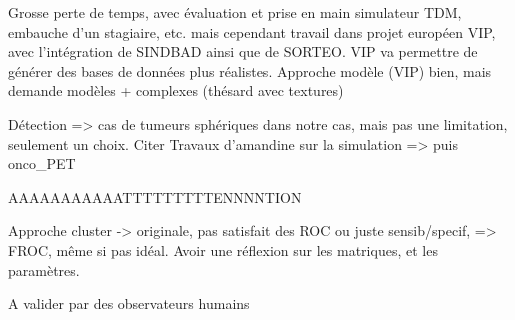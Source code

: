 Grosse perte de temps, avec évaluation et prise en main simulateur TDM, embauche d'un stagiaire, etc.
mais cependant travail dans projet européen VIP, avec l'intégration de SINDBAD ainsi que de SORTEO. VIP va permettre de générer des bases de données plus réalistes.
Approche modèle (VIP) bien, mais demande modèles + complexes (thésard avec textures)

Détection => cas de tumeurs sphériques dans notre cas, mais pas une limitation, seulement un choix. Citer Travaux d'amandine sur la simulation => puis onco\_PET



AAAAAAAAAAATTTTTTTTTENNNNTION

Approche cluster -> originale, pas satisfait des ROC ou juste sensib/specif, => FROC, même si pas idéal. Avoir une réflexion sur les matriques, et les paramètres.


A valider par des observateurs humains